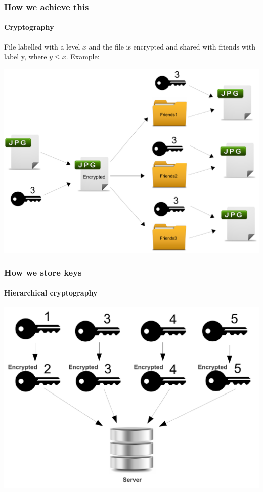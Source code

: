 \documentclass{beamer}
\begin{document}
  \begin{frame}
  	\frametitle{How we achieve this}
  	\framesubtitle{Cryptography}
  	File labelled with a level $x$ and the file is encrypted and shared with friends with label y, where $y \leq x$. Example:
  	\begin{center}
 		\includegraphics[scale=0.40]{images/sharing/sharing_scissored.pdf}
 	\end{center}
  	
  \end{frame}
  
  \begin{frame}
  	\frametitle{How we store keys}
  	\framesubtitle{Hierarchical cryptography}
  	\begin{center}
  		\includegraphics[scale=0.5]{images/keyStorage/keyStorage_scissored.pdf}
  	\end{center}
  \end{frame}
  
\end{document}
